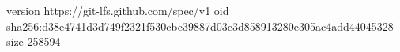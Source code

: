 version https://git-lfs.github.com/spec/v1
oid sha256:d38e4741d3d749f2321f530cbc39887d03c3d858913280e305ac4add44045328
size 258594

